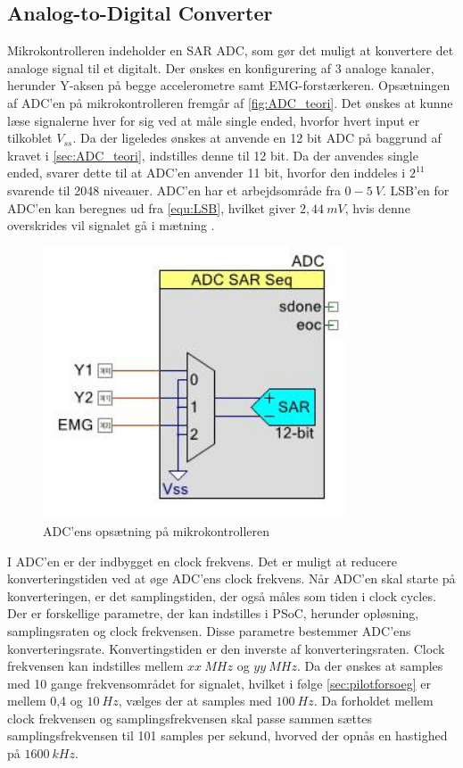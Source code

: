 \subsection{Analog-to-Digital Converter}
Mikrokontrolleren indeholder en SAR ADC, som gør det muligt at konvertere det analoge signal til et digitalt. Der ønskes en konfigurering af 3 analoge kanaler, herunder Y-aksen på begge accelerometre samt EMG-forstærkeren. Opsætningen af ADC'en på mikrokontrolleren fremgår af \autoref{fig:ADC_teori}. Det ønskes at kunne læse signalerne hver for sig ved at måle single ended, hvorfor hvert input er tilkoblet $V_{ss}$. Da der ligeledes ønskes at anvende en 12 bit ADC på baggrund af kravet i \autoref{sec:ADC_teori}, indstilles denne til 12 bit. Da der anvendes single ended, svarer dette til at ADC'en anvender 11 bit, hvorfor den inddeles i $2^{11}$ svarende til 2048 niveauer. ADC'en har et arbejdsområde fra $0-5~V$. LSB'en for ADC'en kan beregnes ud fra \autoref{equ:LSB}, hvilket giver $2,44~mV$, hvis denne overskrides vil signalet gå i mætning \citep{ADC2014}. 

\begin{figure}[H]
\centering
\includegraphics[width=0.8\textwidth]{figures/implementering/ADC_imp.jpeg}
\caption{ADC'ens opsætning på mikrokontrolleren}
\label{fig:ADC_teori}
\end{figure}

I ADC'en er der indbygget en clock frekvens. Det er muligt at reducere konverteringstiden ved at øge ADC'ens clock frekvens. Når ADC'en skal starte på konverteringen, er det samplingstiden, der også måles som tiden i clock cycles. Der er forskellige parametre, der kan indstilles i PSoC, herunder opløsning, samplingsraten og clock frekvensen. Disse parametre bestemmer ADC'ens konverteringsrate. Konvertingstiden er den inverste af konverteringsraten. Clock frekvensen kan indstilles mellem $xx~MHz$ og $yy~MHz$.\citep{cypresspsoc42014} Da der ønskes at samples med 10 gange frekvensområdet for signalet, hvilket i følge  \autoref{sec:pilotforsoeg} er mellem 0,4 og $10~Hz$, vælges der at samples med $100~Hz$. Da forholdet mellem clock frekvensen og samplingsfrekvensen skal passe sammen sættes samplingsfrekvensen til 101 samples per sekund, hvorved der opnås en hastighed på $1600~kHz$.
 